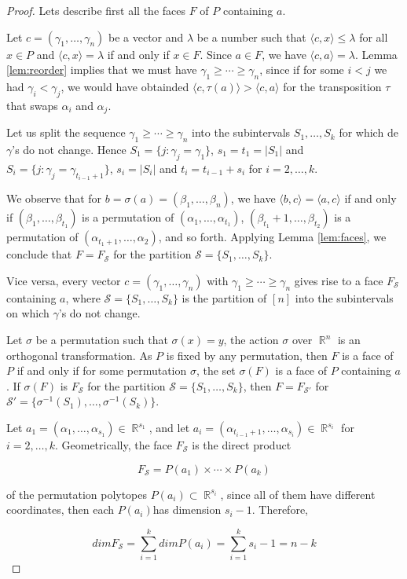 \documentclass[12pt]{amsart}
\numberwithin{equation}{section}
\newcommand{\RR}{\operatorname{\mathbb{R}}}
\begin{document}
\begin{proof}

Lets describe first all the faces $F$ of $P$ containing $a$.

Let $c=(\gamma_1,\dots,\gamma_n)$ be a vector and $\lambda$ be a number such that $\langle c, x \rangle \leq \lambda$ for all $x\in P$ and $\langle c, x \rangle = \lambda$ if and only if $x\in F$. Since $a\in F$, we have $\langle c, a \rangle=\lambda$. Lemma \ref{lem:reorder} implies that we must have $\gamma_1\geq\cdots\geq\gamma_n$, since if for some $i<j$ we had $\gamma_i<\gamma_j$, we would have obtainded $\langle c, \tau(a) \rangle > \langle c, a \rangle$ for the transposition $\tau$ that swaps $\alpha_i$ and $\alpha_j$.

Let us split the sequence $\gamma_1\geq\cdots\geq\gamma_n$ into the subintervals $S_1,\dots,S_k$ for which de $\gamma$'s do not change. Hence $S_1=\{ j:\gamma_j=\gamma_1 \}$, $s_1=t_1=|S_1|$ and $S_i=\{ j:\gamma_j=\gamma_{t_{i-1}+1} \}$, $s_i=|S_i|$ and $t_i=t_{i-1}+s_i$ for $i=2,\dots,k$.

We observe that for $b=\sigma(a)=(\beta_1,\dots,\beta_n)$, we have $\langle b, c \rangle=\langle a, c \rangle$ if and only if $(\beta_1,\dots,\beta_{t_1})$ is a permutation of $(\alpha_1,\dots,\alpha_{t_1})$, $(\beta_{t_{1}}+1,\dots,\beta_{t_2})$ is a permutation of $(\alpha_{t_{1}+1},\dots,\alpha_{2})$, and so forth. Applying Lemma \ref{lem:faces}, we conclude that $F=F_{\mathcal{S}}$ for the partition $\mathcal{S}=\{ S_1,\dots ,S_k \}$.

Vice versa, every vector $c=(\gamma_1,\dots,\gamma_n)$ with $\gamma_1\geq\cdots\geq\gamma_n$ gives rise to a face $F_{\mathcal{S}}$ containing $a$, where $\mathcal{S}=\{ S_1,\dots ,S_k \}$ is the partition of $[n]$ into the subintervals on which $\gamma$'s do not change.

Let $\sigma$ be a permutation such that $\sigma(x)=y$, the action $\sigma $ over $\RR^n$ is an orthogonal transformation. As $P$ is fixed by any permutation, then $F$ is a face of $P$ if and only if for some permutation $\sigma$, the set $\sigma(F)$ is a face of $P$ containing $a$. If $\sigma(F)$ is $F_{\mathcal{S}}$ for the partition $\mathcal{S}=\{ S_1,\dots ,S_k \}$, then $F=F_{\mathcal{S'}}$ for $\mathcal{S'}=\{ \sigma^{-1}(S_1),\dots ,\sigma^{-1}(S_k) \}$.

Let $a_1=(\alpha_1,\dots,\alpha_{s_1})\in \RR^{s_1}$, and let $a_i=(\alpha_{t_{i-1}+1},\dots,\alpha_{s_i})\in \RR^{s_i}$ for $i=2,\dots, k$. Geometrically, the face $F_{\mathcal{S}}$ is the direct product 

$$ F_{\mathcal{S}}=P(a_1)\times \cdots \times P(a_k) $$

of the permutation polytopes $P(a_i)\subset \RR^{s_i}$, since all of them have different coordinates, then each $P(a_i)$has dimension $s_i-1$. Therefore,

$$ dim F_{\mathcal{S}}=\sum_{i=1}^k dim P(a_i)=\sum_{i=1}^k s_i-1=n-k$$

\end{proof}
\end{document}
